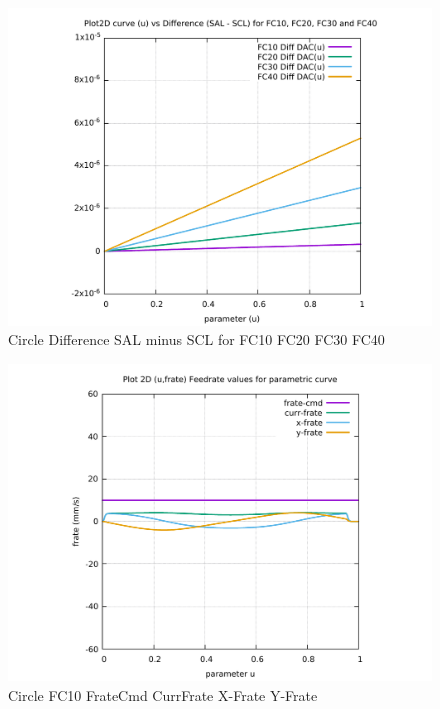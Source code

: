 \begin{figure}
	\caption     {Circle Difference SAL minus SCL for FC10 FC20 FC30 FC40}
	\label{26-img-Circle-Difference-SAL-minus-SCL-for-FC10-FC20-FC30-FC40.pdf}
	\includegraphics[width=1.00\textwidth]{Chap4/appendix/app-Circle/plots/26-img-Circle-Difference-SAL-minus-SCL-for-FC10-FC20-FC30-FC40.pdf}
\end{figure}


\clearpage
\pagebreak

\begin{figure}
	\caption     {Circle FC10 FrateCmd CurrFrate X-Frate Y-Frate}
	\label{27-img-Circle-FC10-FrateCmd-CurrFrate-X-Frate-Y-Frate.pdf}
	\includegraphics[width=1.00\textwidth]{Chap4/appendix/app-Circle/plots/27-img-Circle-FC10-FrateCmd-CurrFrate-X-Frate-Y-Frate.pdf}
\end{figure}


